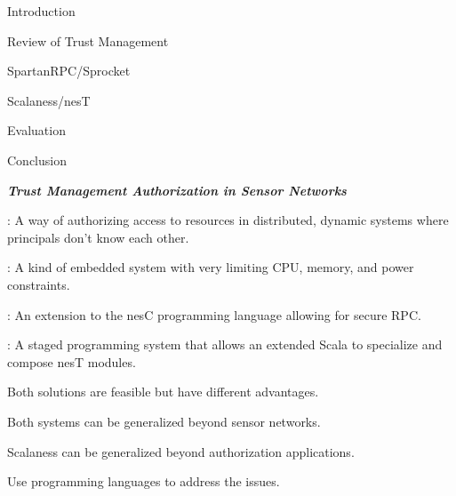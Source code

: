 
\newcommand{\cedge}[1]{\stackrel{#1}{\longleftarrow}}
\newcommand{\cred}[3]{\mathit{#1} \cedge{#3} \mathit{#2}}
\newcommand{\datalog}{\text{Datalog}}
\newcommand\T{\rule{0pt}{2.1ex}}

\begin{cenumerate}
\item Introduction
\item Review of Trust Management
\item SpartanRPC/Sprocket
\item Scalaness/nesT
\item Evaluation
\item Conclusion
\end{cenumerate}
\stopslide


\centerline{\emph{\textbf{Trust Management Authorization in Sensor Networks}}}

\begin{citemize}
\item {}: A way of authorizing access to resources in distributed, dynamic
  systems where principals don't know each other.

\item {}: A kind of embedded system with very limiting CPU, memory, and
  power constraints.
\end{citemize}
\stopslide


\begin{citemize}
\item {}: An extension to the nesC programming language allowing for secure RPC.

\item {}: A staged programming system that allows an extended Scala to
  specialize and compose nesT modules.
\end{citemize}

Both solutions are feasible but have different advantages.

Both systems can be generalized beyond sensor networks.

Scalaness can be generalized beyond authorization applications.
\stopslide


Use programming languages to address the issues.

